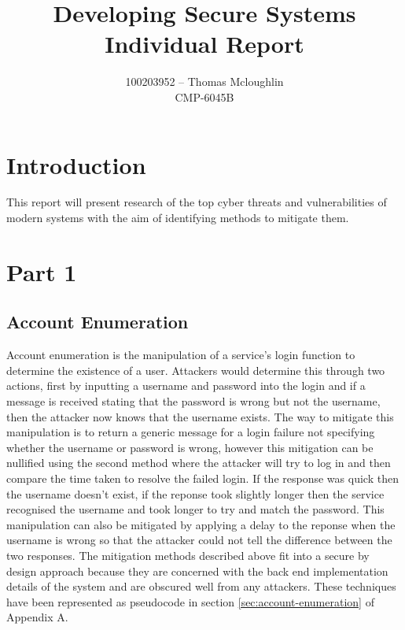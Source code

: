\documentclass{ueacmpstyle}
\begin{document}
	\title{Developing Secure Systems Individual Report}
	\author{
		100203952 -- Thomas Mcloughlin\\
		CMP-6045B
	}
	\maketitle

    \section{Introduction}\label{sec:Intro}
    This report will present research of the top cyber threats and vulnerabilities of modern 
    systems with the aim of identifying methods to mitigate them.

    \section{Part 1}\label{sec:Pt1}
      
      \subsection{Account Enumeration}\label{sub:AccEnum}
      Account enumeration is the manipulation of a service's login function to determine 
      the existence of a user. Attackers would determine this through two actions, first 
      by inputting a username and password into the login and if a message is received 
      stating that the password is wrong but not the username, then the attacker now 
      knows that the username exists. The way to mitigate this manipulation is to return 
      a generic message for a login failure not specifying whether the username or 
      password is wrong, however this mitigation can be nullified using the second method 
      where the attacker will try to log in and then compare the time taken to resolve the 
      failed login. If the response was quick then the username doesn't exist, if the 
      reponse took slightly longer then the service recognised the username and took longer 
      to try and match the password. This manipulation can also be mitigated by applying a 
      delay to the reponse when the username is wrong so that the attacker could not 
      tell the difference between the two responses.
      The mitigation methods described above fit into a secure by design approach because 
      they are concerned with the back end implementation details of the system and are 
      obscured well from any attackers. These techniques have been represented as 
      pseudocode in section \ref{sec:account-enumeration} of Appendix A.
\end{document}
